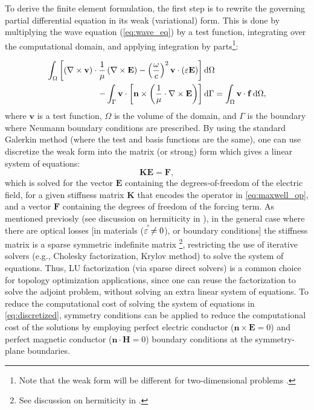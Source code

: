     To derive the finite element formulation, the first step is to rewrite the governing partial differential equation in its weak (variational) form. This is done by multiplying the wave equation (\eqref{eq:wave_eq}) by a test function, integrating over the computational domain, and applying integration by parts\footnote{Note that the weak form will be different for two-dimensional problems \cite{ownpub0, ownpub2}.}:

    \begin{align}
        \int_\Omega \left[ \left( \nabla \times \mathbf{v} \right) \cdot
            \frac{1}{\mu} \left( \nabla \times \mathbf{E} \right)- \left(\frac{\omega}{c}\right)^2 \mathbf{v}\cdot(\varepsilon\mathbf{E})\right]& \mathop{}\!\text{d} \Omega \nonumber \\ 
        - \int_\Gamma \mathbf{v} \cdot \left[ \mathbf{n} \times \left(
            \frac{1}{\mu} \cdot \nabla \times \mathbf{E} \right) \right]& \mathop{}\!\text{d} \Gamma 
        = \int_\Omega \mathbf{v} \cdot \mathbf{f} \mathop{}\!\text{d} \Omega,
    \end{align}
    where $\mathbf{v}$ is a test function, $\Omega$ is the volume of the domain,
    and $\Gamma$ is the boundary where Neumann boundary conditions
    are prescribed. By using
    the standard Galerkin method (where the test and basis functions are the same),
    one can use discretize the weak form
    into the matrix (or strong) form which gives a linear system of equations:
    \begin{equation}\label{eq:discretized}
        \mathbf{K} \mathbf{E} = \mathbf{F},
    \end{equation}
    which is solved for the vector $\mathbf{E}$ containing the degrees-of-freedom of the electric field, for a given stiffness matrix $\mathbf{K}$ that encodes the operator 
    in \eqref{eq:maxwell_op}, and a 
    vector $\mathbf{F}$ containing the degrees of freedom of the forcing term. As mentioned previosly (see discussion on hermiticity in ), in the general case where there are optical losses [in materials ($\varepsilon^{\tilde \tilde} \neq 0$), or boundary conditions] the stiffness matrix is a sparse symmetric indefinite matrix \footnote{See discussion on hermiticity
    in .},
    restricting the use of iterative solvers
    (e.g., Cholesky factorization, Krylov method) to solve the system of equations.
    Thus, LU factorization (via sparse direct solvers) is
    a common choice for topology optimization applications, since one can reuse the factorization to solve
    the adjoint problem, without solving an extra linear system of equations. To reduce the computational cost of solving the system of equations in 
    \eqref{eq:discretized}, symmetry conditions can be applied to reduce the computational
    cost of the solutions by employing perfect electric conductor ($\mathbf{n} \times \mathbf{E}=0$) and perfect
    magnetic
    conductor ($\mathbf{n} \cdot \mathbf{H}=0$) boundary conditions at the symmetry-plane boundaries.

